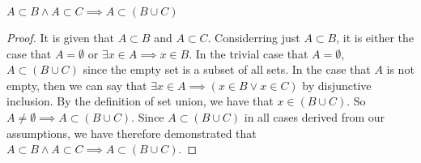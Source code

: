 \documentclass[main.tex]{subfiles}
\begin{document}
\begin{thm}
	\(A \subset B \land A \subset C \implies A \subset (B \cup C)\)
\end{thm}
\begin{proof}
	It is given that \(A \subset B\) and \(A \subset C\). Considerring just
	\(A \subset B\), it is either the case that \(A = \emptyset\) or
	\(\exists x \in A \implies x \in B\). In the trivial case that
	\(A = \emptyset\), \(A \subset (B \cup C)\) since the empty set is a
	subset of all sets. In the case that \(A\) is not empty, then we can say
	that \(\exists x \in A \implies (x \in B \lor x \in C)\) by disjunctive
	inclusion. By the definition of set union, we have that
	\(x \in (B \cup C)\). So
	\(A \neq \emptyset \implies A \subset (B \cup C)\). Since
	\(A \subset (B \cup C)\) in all cases derived from our assumptions, we
	have therefore demonstrated that
	\(A \subset B \land A \subset C \implies A \subset (B \cup C)\).
\end{proof}
\end{document}
